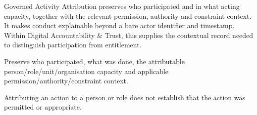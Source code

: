 Governed Activity Attribution preserves who participated and in what acting capacity, together with the relevant permission, authority and constraint context. It makes conduct explainable beyond a bare actor identifier and timestamp. Within Digital Accountability \& Trust, this supplies the contextual record needed to distinguish participation from entitlement.



Preserve who participated, what was done, the attributable person/\allowbreak{}role/\allowbreak{}unit/\allowbreak{}organisation capacity and applicable permission/\allowbreak{}authority/\allowbreak{}constraint context.



Attributing an action to a person or role does not establish that the action was permitted or appropriate.


